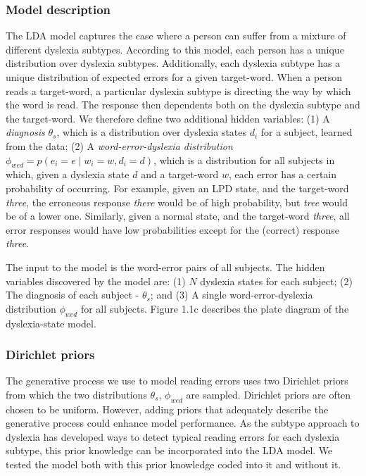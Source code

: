 \subsubsection{Model description}
The LDA model captures the case where a person can suffer from a mixture of different dyslexia subtypes. According to this model, each person has a unique distribution over dyslexia subtypes. Additionally, each dys\-lexia subtype has a unique distribution of expected errors for a given target-word. When a person reads a target-word, a particular dyslexia subtype is directing the way by which the word is read. The response then dependents both on the dyslexia subtype and the target-word. We therefore define two additional hidden variables: (1) A {\it diagnosis} $ \theta_{s} $, which is a distribution over dyslexia states $ d_i $ for a subject, learned from the data; (2) A {\it word-error-dyslexia distribution} $ \phi_{wed} = p(e_i = e \mid w_i = w , d_i= d) $, which is a distribution for all subjects in which, given a dyslexia state $d$ and a target-word $w$, each error has a certain probability of occurring. For example, given an LPD state, and the target-word {\it three}, the erroneous response {\it there} would be of high probability, but {\it tree} would be of a lower one. Similarly, given a normal state, and the target-word {\it three}, all error responses would have low probabilities except for the (correct) response {\it three}. 

The input to the model is the word-error pairs of all subjects. The hidden variables discovered by the model are: (1) $N$ dyslexia states for each subject; (2) The diagnosis of each subject - $ \theta_{s} $; and (3) A single word-error-dyslexia distribution $ \phi_{wed} $ for all subjects. Figure 1.1c describes the plate diagram of the dyslexia-state model.

\subsubsection{Dirichlet priors}
The generative process we use to model reading errors uses two Dirichlet priors from which the two distributions $ \theta_{s}$, $\phi_{wed} $ are sampled. Dirichlet priors are often chosen to be uniform. However, adding priors that adequately describe the generative process could enhance model performance. As the subtype approach to dyslexia has developed ways to detect typical reading errors for each dyslexia subtype, this prior knowledge can be incorporated into the LDA model. We tested the model both with this prior knowledge coded into it and without it.

